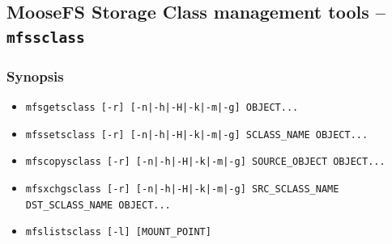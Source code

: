 \documentclass[a4paper,11pt,english]{report}
\def\code#1{\texttt{#1}}
\begin{document}
			\pagebreak
			
			\subsection{MooseFS Storage Class management tools -- \code{mfssclass}}
				\label{section:moosefs-storage-class-management-tools}
		
				\subsubsection{Synopsis}
					\begin{itemize}
						\item \code{mfsgetsclass [-r] [-n|-h|-H|-k|-m|-g] OBJECT...}
				
						\item \code{mfssetsclass [-r] [-n|-h|-H|-k|-m|-g] SCLASS\_NAME OBJECT...}
				
						\item \code{mfscopysclass [-r] [-n|-h|-H|-k|-m|-g] SOURCE\_OBJECT OBJECT...}
				
						\item \code{mfsxchgsclass [-r] [-n|-h|-H|-k|-m|-g] SRC\_SCLASS\_NAME DST\_SCLASS\_NAME OBJECT...}
				
						\item \code{mfslistsclass [-l] [MOUNT\_POINT]}
					\end{itemize}
					
\end{document}
